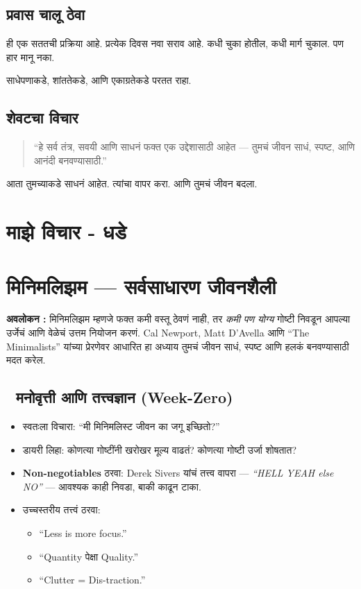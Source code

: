 \section*{प्रवास चालू ठेवा}
ही एक सततची प्रक्रिया आहे.  
प्रत्येक दिवस नवा सराव आहे.  
कधी चुका होतील, कधी मार्ग चुकाल.  
पण हार मानू नका.  

साधेपणाकडे, शांततेकडे,  
आणि एकाग्रतेकडे परतत राहा.  

\section*{शेवटचा विचार}
\begin{quote}
“हे सर्व तंत्र, सवयी आणि साधनं  
फक्त एक उद्देशासाठी आहेत —  
तुमचं जीवन साधं, स्पष्ट, आणि आनंदी बनवण्यासाठी.”  
\end{quote}

आता तुमच्याकडे साधनं आहेत.  
त्यांचा वापर करा.  
आणि तुमचं जीवन बदला.  


\chapter*{माझे विचार - धडे }

\chapter{मिनिमलिझम — सर्वसाधारण जीवनशैली}

\textbf{अवलोकन :}  
मिनिमलिझम म्हणजे फक्त कमी वस्तू ठेवणं नाही, तर \textit{कमी पण योग्य} गोष्टी निवडून आपल्या उर्जेचं आणि वेळेचं उत्तम नियोजन करणं. Cal Newport, Matt D’Avella आणि “The Minimalists” यांच्या प्रेरणेवर आधारित हा अध्याय तुमचं जीवन साधं, स्पष्ट आणि हलकं बनवण्यासाठी मदत करेल.  

\section*{🌱 मनोवृत्ती आणि तत्त्वज्ञान (Week-Zero)}

\begin{itemize}
  \item स्वतःला विचारा: “मी मिनिमलिस्ट जीवन का जगू इच्छितो?”  
  \item डायरी लिहा: कोणत्या गोष्टींनी खरोखर मूल्य वाढतं? कोणत्या गोष्टी उर्जा शोषतात?  
  \item \textbf{Non-negotiables} ठरवा: Derek Sivers यांचं तत्त्व वापरा — \textit{“HELL YEAH else NO”} — आवश्यक काही निवडा, बाकी काढून टाका.  
  \item उच्चस्तरीय तत्त्वं ठरवा:  
  \begin{itemize}
    \item “Less is more focus.”  
    \item “Quantity पेक्षा Quality.”  
    \item “Clutter = Dis-traction.”  
  \end{itemize}
\end{itemize}

